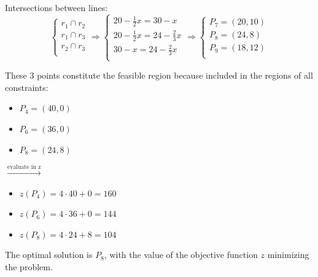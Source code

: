 \documentclass[unicode,11pt,a4paper,oneside,numbers=endperiod,openany]{scrartcl}
\begin{document}
Intersections between lines:
\begin{equation*}
	\begin{cases}
		r_1 \cap r_2 \\
		r_1 \cap r_3 \\
		r_2 \cap r_3 \\
	\end{cases}
	\Rightarrow
	\begin{cases}
		20 - \frac{1}{2} x = 30 - x             \\
		20 - \frac{1}{2} x = 24 - \frac{2}{3} x \\
		30 - x = 24 - \frac{2}{3} x             \\
	\end{cases}
	\Rightarrow
	\begin{cases}
		P_7 = (20, 10) \\
		P_8 = (24, 8)  \\
		P_9 = (18, 12) \\
	\end{cases}
\end{equation*}

These 3 points constitute the feasible region
because included in the regions of all constraints:

\vspace{0.5cm}
\begin{minipage}{0.4\textwidth}
	\begin{itemize}
		\setlength\itemsep{0.5em}
		\item $P_4 = (40, 0)$
		\item $P_6 = (36, 0)$
		\item $P_8 = (24, 8)$
	\end{itemize}
\end{minipage}
\begin{minipage}{0.2\textwidth}
	$\xrightarrow{\text{evaluate in z}}$
\end{minipage}
\begin{minipage}{0.4\textwidth}
	\begin{itemize}
		\setlength\itemsep{0.5em}
		\item $z(P_4) = 4 \cdot 40 + 0 = 160$
		\item $z(P_6) = 4 \cdot 36 + 0 = 144$
		\item $z(P_8) = 4 \cdot 24 + 8 = 104$
	\end{itemize}
\end{minipage}
\vspace{0.5cm}

The optimal solution is $P_8$,
with the value of the objective function $z$ minimizing the problem.
\end{document}
